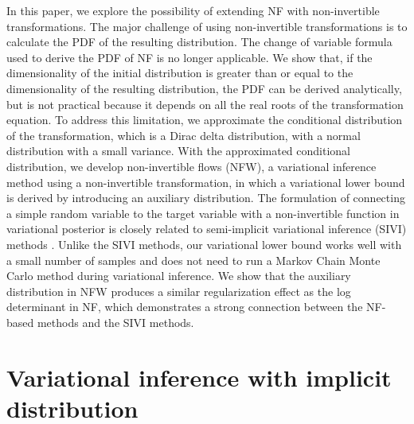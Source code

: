 \documentclass[twoside]{article}
\newcommand{\acr}[1]{\textsc{#1}\xspace}
\newcommand{\us}{\acr{NFW}}
\begin{document}
In this paper, we explore the possibility of extending NF with non-invertible transformations. The major challenge of using non-invertible transformations is to calculate the PDF of the resulting distribution. The change of variable formula used to derive the PDF of NF is no longer applicable. We show that, if the dimensionality of the initial distribution is greater than or equal to the dimensionality of the resulting distribution, the PDF can be derived analytically, but is not practical because it depends on all the real roots of the transformation equation. To address this limitation, we approximate the conditional distribution of the transformation, which is a Dirac delta distribution, with a normal distribution with a small variance. With the approximated conditional distribution, we develop non-invertible flows (\us),  a variational inference method using a non-invertible transformation, in which a variational lower bound is derived by introducing an auxiliary distribution. The formulation of connecting a simple random variable to the target variable with a non-invertible function in variational posterior is closely related to semi-implicit variational inference (SIVI) methods \citep{YinZhou2018, TitsiasRuiz2019, MolchanovEtAl2019}. Unlike the SIVI methods, our variational lower bound works well with a small number of samples and does not need to run a Markov Chain Monte Carlo method during variational inference. We show that the auxiliary distribution in \us produces a similar regularization effect as the log determinant in NF, which demonstrates a strong connection between the NF-based methods and the SIVI methods. 

\section{Variational inference with implicit distribution}
\end{document}
